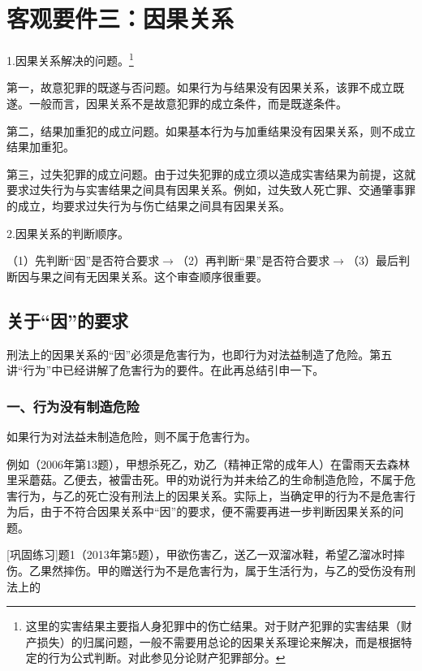 \chapter{客观要件三：因果关系}

\begin{EditionOpeningPanel}
1.因果关系解决的问题。\footnote{这里的实害结果主要指人身犯罪中的伤亡结果。对于财产犯罪的实害结果（财产损失）的归属问题，一般不需要用总论的因果关系理论来解决，而是根据特定的行为公式判断。对此参见分论财产犯罪部分。}

第一，故意犯罪的既遂与否问题。如果行为与结果没有因果关系，该罪不成立既遂。一般而言，因果关系不是故意犯罪的成立条件，而是既遂条件。

第二，结果加重犯的成立问题。如果基本行为与加重结果没有因果关系，则不成立结果加重犯。

第三，过失犯罪的成立问题。由于过失犯罪的成立须以造成实害结果为前提，这就要求过失行为与实害结果之间具有因果关系。例如，过失致人死亡罪、交通肇事罪的成立，均要求过失行为与伤亡结果之间具有因果关系。

2.因果关系的判断顺序。

（1）先判断“因”是否符合要求\ensuremath{\rightarrow}（2）再判断“果”是否符合要求\ensuremath{\rightarrow}（3）最后判断因与果之间有无因果关系。这个审查顺序很重要。
\end{EditionOpeningPanel}

\section{关于“因”的要求}

刑法上的因果关系的“因”必须是危害行为，也即行为对法益制造了危险。第五讲“行为”中已经讲解了危害行为的要件。在此再总结引申一下。

\subsection*{一、行为没有制造危险}

如果行为对法益未制造危险，则不属于危害行为。

例如（2006年第13题），甲想杀死乙，劝乙（精神正常的成年人）在雷雨天去森林里采蘑菇。乙便去，被雷击死。甲的劝说行为并未给乙的生命制造危险，不属于危害行为，与乙的死亡没有刑法上的因果关系。实际上，当确定甲的行为不是危害行为后，由于不符合因果关系中“因”的要求，便不需要再进一步判断因果关系的问题。

[巩固练习]题1（2013年第5题），甲欲伤害乙，送乙一双溜冰鞋，希望乙溜冰时摔伤。乙果然摔伤。甲的赠送行为不是危害行为，属于生活行为，与乙的受伤没有刑法上的

